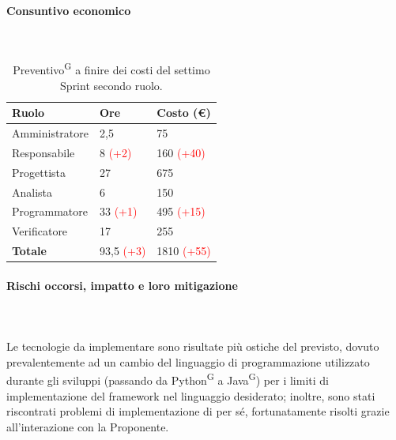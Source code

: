\documentclass[8pt]{article}
\newcommand{\glossterm}[1]{#1\textsuperscript{G}} %
\newcommand{\subsubsubsection}[1]{\paragraph{#1}\mbox{}\\}
\begin{document}
\subsubsubsection{Consuntivo economico}
\begin{table}[ht!]
    \centering
    \begin{tabular}{p{4cm} p{1.8cm} p{2.2cm}}
        \toprule
        \textbf{Ruolo} & \textbf{Ore} & \textbf{Costo (€)} \\
        \midrule
        Amministratore & 2,5 & 75 \\ 
        Responsabile & 8 \textcolor{red}{(+2)} & 160 \textcolor{red}{(+40)} \\ 
        Progettista & 27 & 675 \\ 
        Analista & 6 & 150 \\ 
        Programmatore & 33 \textcolor{red}{(+1)} & 495 \textcolor{red}{(+15)} \\ 
        Verificatore & 17 & 255 \\ 
        \midrule
        \textbf{Totale} & 93,5 \textcolor{red}{(+3)} & 1810 \textcolor{red}{(+55)} \\ 
        \bottomrule 
    \end{tabular}
    \caption{\glossterm{Preventivo} a finire dei costi del settimo Sprint secondo ruolo.}
    \label{table:Preventivo a finire dei costi del settimo Sprint secondo ruolo}
\end{table}
\subsubsubsection{Rischi occorsi, impatto e loro mitigazione} \\
Le tecnologie da implementare sono risultate più ostiche del previsto, dovuto prevalentemente ad un cambio del linguaggio di programmazione utilizzato durante gli sviluppi (passando da \glossterm{Python} a \glossterm{Java}) per i limiti di implementazione del framework nel linguaggio desiderato; inoltre, sono stati riscontrati problemi di implementazione di per sé, fortunatamente risolti grazie all'interazione con la Proponente.
\end{document}
